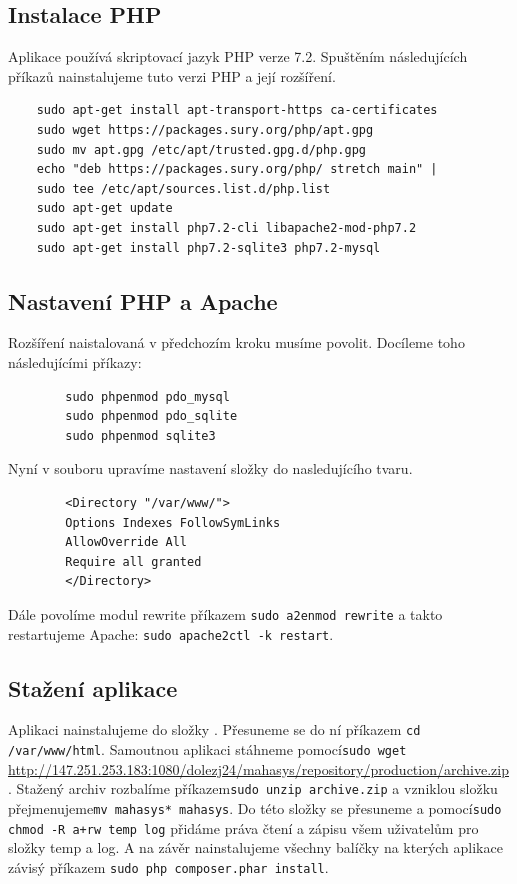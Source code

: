 \documentclass[thesis=B,czech]{FITthesis}[2012/06/26]
\begin{document}
\subsection{Instalace PHP}
	Aplikace používá skriptovací jazyk PHP verze 7.2. Spuštěním následujících příkazů nainstalujeme tuto verzi PHP a její rozšíření.
	\begin{verbatim}
	sudo apt-get install apt-transport-https ca-certificates
	sudo wget https://packages.sury.org/php/apt.gpg
	sudo mv apt.gpg /etc/apt/trusted.gpg.d/php.gpg 
	echo "deb https://packages.sury.org/php/ stretch main" | 
	sudo tee /etc/apt/sources.list.d/php.list
	sudo apt-get update
	sudo apt-get install php7.2-cli libapache2-mod-php7.2
	sudo apt-get install php7.2-sqlite3 php7.2-mysql
	\end{verbatim}
\subsection{Nastavení PHP a Apache}
	Rozšíření naistalovaná v předchozím kroku musíme povolit. Docíleme toho následujícími příkazy:
	\begin{verbatim}
		sudo phpenmod pdo_mysql
		sudo phpenmod pdo_sqlite
		sudo phpenmod sqlite3
	\end{verbatim}
	Nyní v souboru  upravíme nastavení složky\newline{} do nasledujícího tvaru.
	\begin{verbatim}
		<Directory "/var/www/">
		Options Indexes FollowSymLinks
		AllowOverride All
		Require all granted
		</Directory>
	\end{verbatim}
	Dále povolíme modul rewrite příkazem \verb|sudo a2enmod rewrite| a takto restartujeme Apache: \verb|sudo apache2ctl -k restart|.
\subsection{Stažení aplikace}
	Aplikaci nainstalujeme do složky . Přesuneme se do ní příkazem \verb|cd /var/www/html|. Samoutnou aplikaci stáhneme pomocí\newline\verb|sudo wget | \url{http://147.251.253.183:1080/dolezj24/mahasys/repository/production/archive.zip}. Stažený archiv rozbalíme příkazem\newline\verb|sudo unzip archive.zip| a vzniklou složku přejmenujeme\newline\verb|mv mahasys* mahasys|. Do této složky se přesuneme a pomocí\newline\verb|sudo chmod -R a+rw temp log| přidáme práva čtení a zápisu všem uživatelům pro složky temp a log. A na závěr nainstalujeme všechny balíčky na kterých aplikace závisý příkazem \verb|sudo php composer.phar install|.
\end{document}
